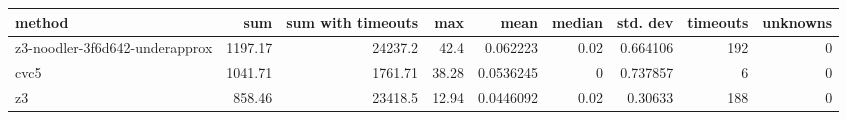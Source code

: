 \begin{tabular}{lrrrrrrrr}
\hline
 method                         &     sum &   sum with timeouts &   max &      mean &   median &   std. dev &   timeouts &   unknowns \\
\hline
 z3-noodler-3f6d642-underapprox & 1197.17 &            24237.2  & 42.4  & 0.062223  &     0.02 &   0.664106 &        192 &          0 \\
 cvc5                           & 1041.71 &             1761.71 & 38.28 & 0.0536245 &     0    &   0.737857 &          6 &          0 \\
 z3                             &  858.46 &            23418.5  & 12.94 & 0.0446092 &     0.02 &   0.30633  &        188 &          0 \\
\hline
\end{tabular}

